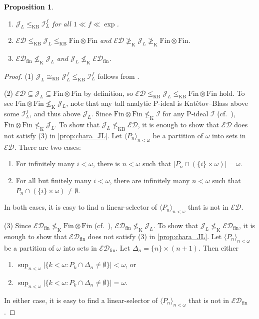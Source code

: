 \documentclass[a4paper,12pt]{amsart}
\newtheorem{prop}[thm]{Proposition}
\theoremstyle{definition}
\numberwithin{thm}{section}
\numberwithin{equation}{section}
\newcommand{\ed}{\mathcal{ED}}
\newcommand{\I}{\mathscr{I}}
\newcommand{\J}{\mathscr{J}}
\newcommand{\edfin}{\mathcal{ED}_\mathrm{fin}}
\newcommand{\finfin}{\mathrm{Fin}\otimes\mathrm{Fin}}
\begin{document}
    \begin{prop}\label{prop:JL_KB}\leavevmode
        \begin{enumerate}
            \item $\J_L \leq_{\mathrm{KB}} \I_L^f$ for all $1\ll f\ll \exp$.
            \item $\ed\leq_{\mathrm{KB}}\J_L\leq_{\mathrm{KB}}\finfin$ and $\ed\not\geq_{\mathrm{K}}\J_L\not\geq_{\mathrm{K}}\finfin$.
            \item $\edfin\not\leq_{\mathrm{K}}\J_L$ and $\J_L\not\leq_{\mathrm{K}}\edfin$.
        \end{enumerate}
    \end{prop}
    \begin{proof}
        (1) $\J_L\cong_{\mathrm{KB}}\J^f_L \leq_{\mathrm{KB}} \I^f_L$ follows from .

        (2) $\ed\subseteq\J_L\subseteq\finfin$ by definition, so $\ed\leq_{\mathrm{KB}}\J_L\leq_{\mathrm{KB}}\finfin$ hold. To see $\finfin\not\leq_{\mathrm{K}} \J_L$, note that any tall analytic P-ideal is Kat\v{e}tov--Blass above some $\I_L^f$, and thus above $\J_L$. Since $\finfin\not\leq_{\mathrm{K}} \I$ for any P-ideal $\I$ (cf.\ \cite[Observation 2.3]{BF17}), $\finfin\not\leq_{\mathrm{K}} \J_L$. To show that $\J_L\not\leq_{\mathrm{KB}}\ed$, it is enough to show that $\ed$ does not satisfy (3) in \cref{prop:chara_JL}. Let $\langle P_n\rangle_{n<\omega}$ be a partition of $\omega$ into sets in $\ed$.  There are two cases:
        \begin{enumerate}[label=(\roman*)]
            \item For infinitely many $i<\omega$, there is $n<\omega$ such that $\lvert P_n\cap (\{i\}\times\omega)\rvert = \omega$.
            \item For all but finitely many $i<\omega$, there are infinitely many $n<\omega$ such that $P_n\cap(\{i\}\times\omega)\neq\emptyset$.
        \end{enumerate}
        In both cases, it is easy to find a linear-selector of $\langle P_n\rangle_{n<\omega}$ that is not in $\ed$.
        
        (3) Since $\edfin\not\leq_{\mathrm{K}}\finfin$ (cf.\ \cite{Hru17}), $\edfin\not\leq_{\mathrm{K}}\J_L$. To show that $\J_L\not\leq_{\mathrm{K}}\edfin$, it is enough to show that $\edfin$ does not satisfy (3) in \cref{prop:chara_JL}. Let $\langle P_n\rangle_{n<\omega}$ be a partition of $\omega$ into sets in $\edfin$.  Let $\Delta_n = \{n\}\times (n+1)$. Then either
        \begin{enumerate}[label=(\roman*)]
            \item $\sup_{n<\omega}\lvert\{k<\omega: P_k\cap\Delta_n\neq\emptyset\}\rvert < \omega$, or
            \item $\sup_{n<\omega}\lvert\{k<\omega: P_k\cap\Delta_n\neq\emptyset\}\rvert = \omega$.
        \end{enumerate}
        In either case, it is easy to find a linear-selector of $\langle P_n\rangle_{n<\omega}$ that is not in $\edfin$.
    \end{proof}
\end{document}
